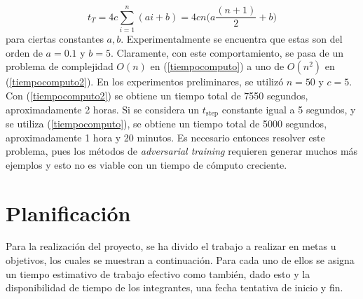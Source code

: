 \documentclass[conference]{IEEEtran}
\begin{document}
\begin{equation}\label{tiempocomputo2}
    t_{T} = 4c \sum_{i=1}^n ( a i + b ) = 4cn\bigg(a\frac{(n+1)}{2} + b\bigg)
\end{equation}
para ciertas constantes $a,b$. Experimentalmente se encuentra que estas son del orden de $a=0.1$ y $b=5$. Claramente, con este comportamiento, se pasa de un problema de complejidad $O(n)$ en (\ref{tiempocomputo}) a uno de $O(n^2)$ en (\ref{tiempocomputo2}). En los experimentos preliminares, se utilizó $n=50$ y $c=5$. Con (\ref{tiempocomputo2}) se obtiene un tiempo total de 7550 segundos, aproximadamente 2 horas. Si se considera un $t_{\text{step}}$ constante igual a 5 segundos, y se utiliza (\ref{tiempocomputo}), se obtiene un tiempo total de 5000 segundos, aproximadamente 1 hora y 20 minutos. Es necesario entonces resolver este problema, pues los métodos de \textit{adversarial training} requieren generar muchos más ejemplos y esto no es viable con un tiempo de cómputo creciente. 

\section{Planificación}
Para la realización del proyecto, se ha divido el trabajo a realizar en metas u objetivos, los cuales se muestran a continuación. Para cada uno de ellos se asigna un tiempo estimativo de trabajo efectivo como también, dado esto y la disponibilidad de tiempo de los integrantes, una fecha tentativa de inicio y fin. 
\end{document}
